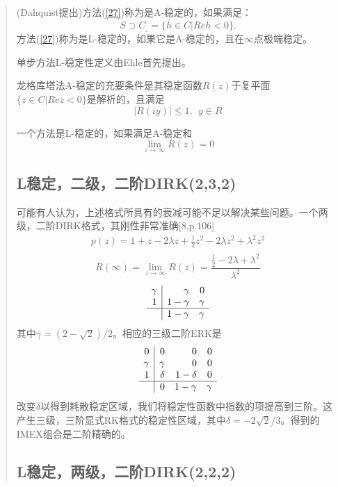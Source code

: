 \documentclass{article}
\begin{document}
\begin{CJK}{UTF8}{gkai}
\begin{quotation}
(Dahquist提出)方法(\ref{27})称为是A-稳定的，如果满足：
\begin{equation*}
S\supset C_{\_}=\{\bar{h}\in C|Re\bar{h}<0\}.
\end{equation*}
方法(\ref{27})称为是L-稳定的，如果它是A-稳定的，且在$\infty$点极端稳定。

单步方法L-稳定性定义由Ehle首先提出。

龙格库塔法A-稳定的充要条件是其稳定函数$R(z)$于复平面$\{z\in C|Rez<0\}$是解析的，且满足
\begin{equation}
|R(iy)|\le 1,~~y\in R
\end{equation}

一个方法是L-稳定的，如果满足A-稳定和
\begin{equation*}
\lim\limits_{z\to\infty}R(z)=0
\end{equation*}
\subsection{L稳定，二级，二阶DIRK(2,3,2)}

可能有人认为，上述格式所具有的衰减可能不足以解决某些问题。一个两级，二阶DIRK格式，其刚性非常准确[8,p.106]
\begin{gather*}
p(z)=1+z-2\lambda z+\frac{1}{2}z^2-2\lambda z^2+\lambda^2z^2\\
\end{gather*}
\begin{equation*}
R(\infty)=\lim\limits_{z\to \infty}R(z)=\frac{\frac{1}{2}-2\lambda+\lambda^2}{\lambda^2}
\end{equation*}
\[
\begin{array}{r|rr}
\gamma & \gamma & 0\\1 & 1-\gamma & \gamma\\
\hline
& 1-\gamma & \gamma
\end{array}
\]
其中$\gamma=(2-\sqrt{2})/2$。相应的三级二阶ERK是
\[
\begin{array}{r|rrr}
0 & 0 & 0 & 0\\
\gamma & \gamma & 0 & 0 \\
1 & \delta& 1-\delta & 0\\
\hline
& 0 & 1-\gamma & \gamma
\end{array}
\]
改变$\delta$以得到耗散稳定区域，我们将稳定性函数中指数的项提高到三阶。这产生三级，三阶显式RK格式的稳定性区域，其中$\delta=-2\sqrt{2}/3$。得到的IMEX组合是二阶精确的。

\subsection{L稳定，两级，二阶DIRK(2,2,2)}


\end{quotation}
\end{CJK}
\end{document}
